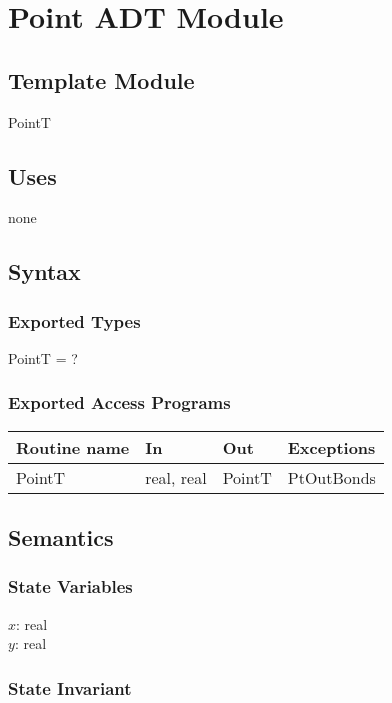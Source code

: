 \documentclass[12pt]{article}
\begin{document}
\section* {Point ADT Module}

\subsection*{Template Module}

PointT

\subsection* {Uses}

none

\subsection* {Syntax}

\subsubsection* {Exported Types}

PointT = ?

\subsubsection* {Exported Access Programs}

\begin{tabular}{| l | l | l | l |}
\hline
\textbf{Routine name} & \textbf{In} & \textbf{Out} & \textbf{Exceptions}\\
\hline
PointT & real, real & PointT & PtOutBonds\\
\hline
\end{tabular}

\subsection* {Semantics}

\subsubsection* {State Variables}

$x$: real\\
$y$: real

\subsubsection* {State Invariant}
\end{document}
